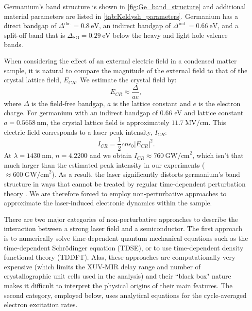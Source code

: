 Germanium's band structure is shown in \cref{fig:Ge_band_structure} and additional material parameters are listed in \cref{tab:Keldysh_parameters}. Germanium has a direct bandgap of $\Delta^{\textrm{dir.}} = 0.8 \ \textrm{eV}$, an indirect bandgap of $\Delta^{\textrm{ind.}} = 0.66 \ \textrm{eV}$, and a split-off band that is $\Delta_{\textrm{SO}} = 0.29 \ \textrm{eV}$ below the heavy and light hole valence bands.

When considering the effect of an external electric field in a condensed matter sample, it is natural to compare the magnitude of the external field to that of the crystal lattice field, $E_{CR}$. We estimate the crystal field by:
\begin{equation}
	E_{CR} \approx \frac{\Delta}{a e},
\end{equation}
where $\Delta$ is the field-free bandgap, $a$ is the lattice constant and $e$ is the electron charge. For germanium with an indirect bandgap of 0.66 eV and lattice constant ${a=0.5658 \ \textrm{nm}}$, the crystal lattice field is approximately ${11.7 \ \textrm{MV/cm}}$. This electric field corresponds to a laser peak intensity, $I_{CR}$:
\begin{equation}
	I_{CR} = \frac{1}{2} c n \epsilon_0 |E_{CR}|^2.
\end{equation}
At $\lambda = 1430 \ \textrm{nm}$, $n=4.2200$ and we obtain ${I_{CR} \approx 760 \ \textrm{GW/cm}^2}$, which isn't that much larger than the estimated peak intensity in our experiments ($\approx 600 \ \textrm{GW/cm}^2$). As a result, the laser significantly distorts germanium's band structure in ways that cannot be treated by regular time-dependent perturbation theory \cite{gruzdevUltrafastModificationBand2018}. We are therefore forced to employ non-perturbative approaches to approximate the laser-induced electronic dynamics within the sample.

There are two major categories of non-perturbative approaches to describe the interaction between a strong laser field and a semiconductor. The first approach is to numerically solve time-dependent quantum mechanical equations such as the time-dependent Schr\"{o}dinger equation (TDSE), or to use time-dependent density functional theory (TDDFT). Alas, these approaches are computationally very expensive (which limits the XUV-MIR delay range and number of crystallographic unit cells used in the analysis) and their ``black box" nature makes it difficult to interpret the physical origins of their main features. The second category, employed below, uses analytical equations for the cycle-averaged electron excitation rates.

